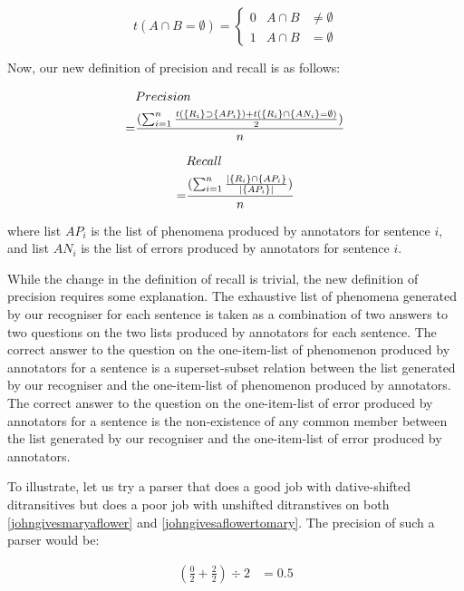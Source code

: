 \documentclass[11pt]{article}
\begin{document}
\[
t(A \cap B=\emptyset) = \left\{ 
\begin{array}{ccc}
0 & A \cap B & \neq \emptyset \\
1 & A \cap B & =\emptyset 
\end{array} \right.
\]

Now, our new definition of precision and recall is as follows:

\begin{align}
        &  Precision  \\
       =& \frac{(\sum_{i=1}^n \frac{t(\{R_{i}\}\supset\{AP_{i}\})+t(\{R_{i}\}\cap\{AN_{i}\}=\emptyset)}{2})}{n} \notag
\end{align}\label{redefinedprecision}

\begin{align}
        & Recall \\
       =& \frac{(\sum_{i=1}^n \frac{\mid\{R_{i}\}\cap\{AP_{i}\}}{\mid\{AP_{i}\}\mid})}{n} \notag
\end{align}


\noindent where list $AP_{i}$ is the list of phenomena produced by annotators for sentence $i$, and list $AN_{i}$ is the list of errors produced by annotators for sentence $i$.

While the change in the definition of recall is trivial, the new definition of precision requires some explanation. The exhaustive list of phenomena generated by our recogniser for each sentence is taken as a combination of two answers to two questions on the two lists produced by annotators for each sentence. The correct answer to the question on the one-item-list of phenomenon produced by annotators for a sentence is a superset-subset relation between the list generated by our recogniser and the one-item-list of phenomenon produced by annotators. The correct answer to the question on the one-item-list of error produced by annotators for a sentence is the non-existence of any common member between the list generated by our recogniser and the one-item-list of error produced by annotators.

To illustrate, let us try a parser that does a good job with dative-shifted ditransitives but does a poor job with unshifted ditranstives on both  \ref{johngivesmaryaflower} and \ref{johngivesaflowertomary}. The precision of such a parser would be:

 \begin{align*}
            (\frac{0}{2} + \frac{2}{2})\div 2 &= 0.5
\end{align*}
\end{document}
